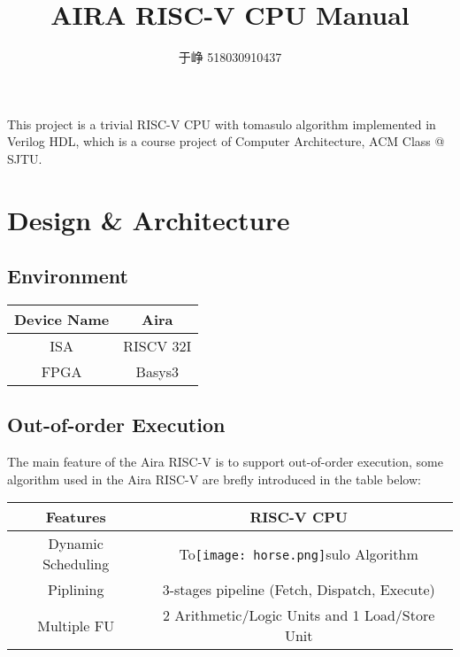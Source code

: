 \documentclass[UTF8]{ctexart}
\begin{document}
\title{AIRA RISC-V CPU Manual}
\author{于峥 518030910437}
\maketitle

This project is a trivial RISC-V CPU with tomasulo algorithm implemented in Verilog HDL, which is a course project of Computer Architecture, ACM Class @ SJTU.
\section{Design \& Architecture}
    \subsection{Environment}
    \begin{center}
        \begin{tabular}{c|c}
            \hline
            Device Name & Aira \\
            \hline
            ISA & RISCV 32I \\
            \hline
            FPGA & Basys3 \\
            \hline
        \end{tabular}
    \end{center}
    \subsection{Out-of-order Execution}
    The main feature of the Aira RISC-V is to support out-of-order execution, some algorithm used in the 
    Aira RISC-V are brefly introduced in the table below:
    \begin{center}
        \begin{tabular}{c|c}
            \hline
            Features & RISC-V CPU\\
            \hline
            Dynamic Scheduling & To\texttt{[image: horse.png]}sulo Algorithm \\
            \hline
            Piplining & 3-stages pipeline (Fetch, Dispatch, Execute)\\
            \hline
            Multiple FU & 2 Arithmetic/Logic Units and 1 Load/Store Unit \\
            \hline
        \end{tabular}
    \end{center}
\end{document}
